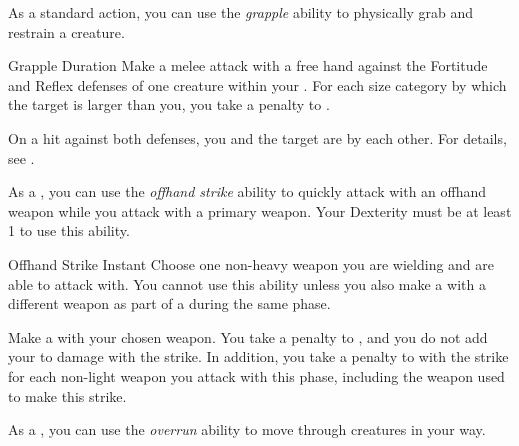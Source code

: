          As a standard action, you can use the \textit{grapple} ability to physically grab and restrain a creature.

        \begin{durationability}{Grapple}\label{Grapple}
            Duration
            \rankline
            Make a melee attack with a free hand against the Fortitude and Reflex defenses of one creature within your .
            For each size category by which the target is larger than you, you take a  penalty to .

            On a hit against both defenses, you and the target are \grappled by each other.
            For details, see .
        \end{durationability}

        \label{Offhand Strike} As a , you can use the \textit{offhand strike} ability to quickly attack with an offhand weapon while you attack with a primary weapon.
        Your Dexterity must be at least 1 to use this ability.
        \begin{instantability}{Offhand Strike}
            Instant
            \rankline
            Choose one non-heavy weapon you are wielding and are able to attack with.
            You cannot use this ability unless you also make a  with a different weapon as part of a  during the same phase.

            Make a  with your chosen weapon.
            You take a  penalty to , and you do not add your  to damage with the strike.
            In addition, you take a  penalty to  with the strike for each non-light weapon you attack with this phase, including the weapon used to make this strike.
        \end{instantability}

         As a , you can use the \textit{overrun} ability to move through creatures in your way.

